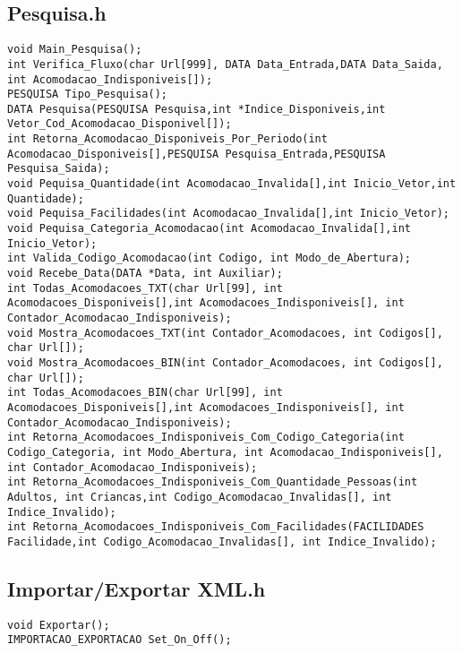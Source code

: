 \documentclass{article}
\begin{document}
\subsection{Pesquisa.h}
\begin{lstlisting}
void Main_Pesquisa(); 
int Verifica_Fluxo(char Url[999], DATA Data_Entrada,DATA Data_Saida, int Acomodacao_Indisponiveis[]);
PESQUISA Tipo_Pesquisa();
DATA Pesquisa(PESQUISA Pesquisa,int *Indice_Disponiveis,int Vetor_Cod_Acomodacao_Disponivel[]);
int Retorna_Acomodacao_Disponiveis_Por_Periodo(int Acomodacao_Disponiveis[],PESQUISA Pesquisa_Entrada,PESQUISA Pesquisa_Saida);
void Pequisa_Quantidade(int Acomodacao_Invalida[],int Inicio_Vetor,int Quantidade);
void Pequisa_Facilidades(int Acomodacao_Invalida[],int Inicio_Vetor);
void Pequisa_Categoria_Acomodacao(int Acomodacao_Invalida[],int Inicio_Vetor);
int Valida_Codigo_Acomodacao(int Codigo, int Modo_de_Abertura);
void Recebe_Data(DATA *Data, int Auxiliar);
int Todas_Acomodacoes_TXT(char Url[99], int Acomodacoes_Disponiveis[],int Acomodacoes_Indisponiveis[], int Contador_Acomodacao_Indisponiveis);
void Mostra_Acomodacoes_TXT(int Contador_Acomodacoes, int Codigos[], char Url[]);
void Mostra_Acomodacoes_BIN(int Contador_Acomodacoes, int Codigos[], char Url[]); 
int Todas_Acomodacoes_BIN(char Url[99], int Acomodacoes_Disponiveis[],int Acomodacoes_Indisponiveis[], int Contador_Acomodacao_Indisponiveis);  
int Retorna_Acomodacoes_Indisponiveis_Com_Codigo_Categoria(int Codigo_Categoria, int Modo_Abertura, int Acomodacao_Indisponiveis[], int Contador_Acomodacao_Indisponiveis); 
int Retorna_Acomodacoes_Indisponiveis_Com_Quantidade_Pessoas(int Adultos, int Criancas,int Codigo_Acomodacao_Invalidas[], int Indice_Invalido);
int Retorna_Acomodacoes_Indisponiveis_Com_Facilidades(FACILIDADES Facilidade,int Codigo_Acomodacao_Invalidas[], int Indice_Invalido);
\end{lstlisting}

\subsection{Importar/Exportar XML.h}
\begin{lstlisting}
void Exportar();
IMPORTACAO_EXPORTACAO Set_On_Off(); 
\end{lstlisting}
\end{document}
